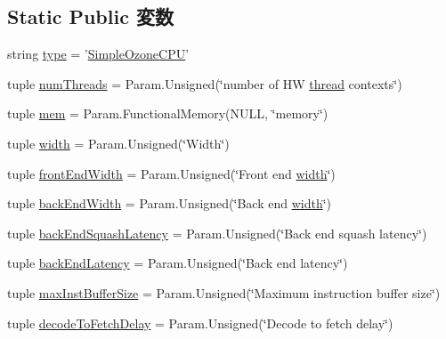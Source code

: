 \subsection*{Static Public 変数}
\begin{DoxyCompactItemize}
\item 
string \hyperlink{classSimpleOzoneCPU_1_1SimpleOzoneCPU_acce15679d830831b0bbe8ebc2a60b2ca}{type} = '\hyperlink{classSimpleOzoneCPU_1_1SimpleOzoneCPU}{SimpleOzoneCPU}'
\item 
tuple \hyperlink{classSimpleOzoneCPU_1_1SimpleOzoneCPU_aac03a586f9fcb28bcbe8c3721888fa93}{numThreads} = Param.Unsigned(\char`\"{}number of HW \hyperlink{classOzoneCPU_a46c1be14c8c6673c367ce5c278305858}{thread} contexts\char`\"{})
\item 
tuple \hyperlink{classSimpleOzoneCPU_1_1SimpleOzoneCPU_ab7876218fa9fd6c9b26081e50523f133}{mem} = Param.FunctionalMemory(NULL, \char`\"{}memory\char`\"{})
\item 
tuple \hyperlink{classSimpleOzoneCPU_1_1SimpleOzoneCPU_a397bb3beea7b21f074bc75e1e71f132f}{width} = Param.Unsigned(\char`\"{}Width\char`\"{})
\item 
tuple \hyperlink{classSimpleOzoneCPU_1_1SimpleOzoneCPU_a37bf0791ba0c000a4576f8a57e81a9ee}{frontEndWidth} = Param.Unsigned(\char`\"{}Front end \hyperlink{classSimpleOzoneCPU_1_1SimpleOzoneCPU_a397bb3beea7b21f074bc75e1e71f132f}{width}\char`\"{})
\item 
tuple \hyperlink{classSimpleOzoneCPU_1_1SimpleOzoneCPU_acda01682639f669f22b3de5631db15a8}{backEndWidth} = Param.Unsigned(\char`\"{}Back end \hyperlink{classSimpleOzoneCPU_1_1SimpleOzoneCPU_a397bb3beea7b21f074bc75e1e71f132f}{width}\char`\"{})
\item 
tuple \hyperlink{classSimpleOzoneCPU_1_1SimpleOzoneCPU_a4237ef2911b088ae0e216acaf38de161}{backEndSquashLatency} = Param.Unsigned(\char`\"{}Back end squash latency\char`\"{})
\item 
tuple \hyperlink{classSimpleOzoneCPU_1_1SimpleOzoneCPU_a76161b8251998574b56e2dfefcb5f4ff}{backEndLatency} = Param.Unsigned(\char`\"{}Back end latency\char`\"{})
\item 
tuple \hyperlink{classSimpleOzoneCPU_1_1SimpleOzoneCPU_a7bef7a8f745bad1c4151dadaef30c4f7}{maxInstBufferSize} = Param.Unsigned(\char`\"{}Maximum instruction buffer size\char`\"{})
\item 
tuple \hyperlink{classSimpleOzoneCPU_1_1SimpleOzoneCPU_a9ef9ac64d6891064a22ab5d341e691f4}{decodeToFetchDelay} = Param.Unsigned(\char`\"{}Decode to fetch delay\char`\"{})
\item 

\end{DoxyCompactItemize}
